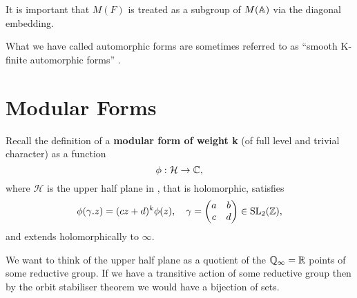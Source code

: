\begin{remark}
    It is important that \(M(F)\) is treated as a subgroup of \(M(\A)\) via the diagonal embedding.
\end{remark}
\begin{remark}
	What we have called automorphic forms are sometimes referred to as ``smooth K-finite automorphic forms'' \cite[2.2]{cogdellLecturesLfunctionsConverse}.
\end{remark}
	
    

\section{Modular Forms} \label{sec:modular-forms}

	Recall the definition of a \textbf{modular form of weight k} (of full level and trivial character) \cite[1.1.2]{diamondFirstCourseModular2005} as a function
		\[\phi: \mathcal{H} \to \C,\]
		where \(\mathcal{H}\) is the upper half plane in \C, that is holomorphic, satisfies 
		\[\phi(\gamma.z) = (cz+d)^k\phi(z), \quad \gamma = \begin{pmatrix}
			a &b \\
			c &d
		\end{pmatrix}\in \SL_2(\Z),\]
		and extends holomorphically to \(\infty\).

	We want to think of the upper half plane as a quotient of the \(\Q_\infty = \R\) points of some reductive group. If we have a transitive action of some reductive group then by the orbit stabiliser theorem we would have a bijection of sets.

